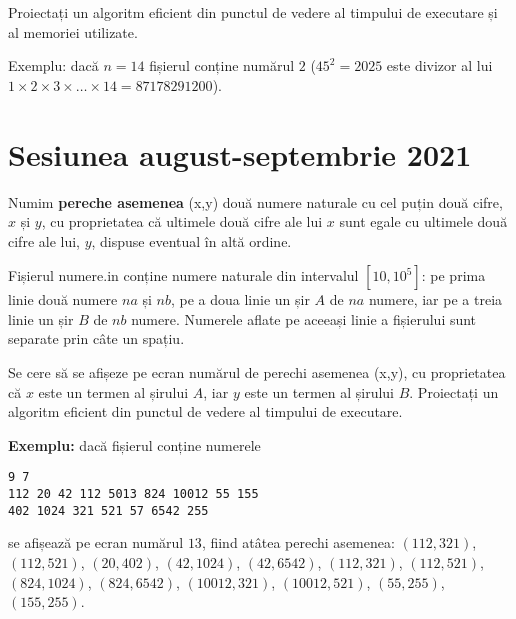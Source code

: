 \documentclass[10pt, a4paper]{article}
\newcommand{\highlight}[1]{{\ttfamily\color{red}#1}}
\begin{document}
\vspace{0.2cm}
\noindent Proiectați un algoritm eficient din punctul de vedere al timpului de executare și al memoriei utilizate.

\vspace{0.2cm}
\noindent Exemplu: dacă \highlight{$n=14$} fișierul conține numărul \highlight{$2$} (\highlight{$45^2=2025$} este divizor al lui \highlight{$1\times2\times3\times\dots\times14=87178291200$}).

\newpage
\section{Sesiunea august-septembrie 2021}
Numim \textbf{pereche asemenea} \highlight{(x,y)} două numere naturale cu cel puțin două cifre, \highlight{$x$} și \highlight{$y$}, cu proprietatea că ultimele două cifre ale lui \highlight{$x$} sunt egale cu ultimele două cifre ale lui, \highlight{$y$}, dispuse eventual în altă ordine.

\vspace{0.2cm}
\noindent Fișierul \highlight{numere.in} conține numere naturale din intervalul \highlight{$[10,10^5]$}: pe prima linie două numere \highlight{$na$} și \highlight{$nb$}, pe a doua linie un șir \highlight{$A$} de \highlight{$na$} numere, iar pe a treia linie un șir \highlight{$B$} de \highlight{$nb$} numere. Numerele aflate pe aceeași linie a fișierului sunt separate prin câte un spațiu.

\vspace{0.2cm}
\noindent Se cere să se afișeze pe ecran numărul de perechi asemenea \highlight{(x,y)}, cu proprietatea că \highlight{$x$} este un termen al șirului \highlight{$A$}, iar \highlight{$y$} este un termen al șirului \highlight{$B$}. Proiectați un algoritm eficient din punctul de vedere al timpului de executare.

\vspace{0.2cm}
\noindent \textbf{Exemplu:} dacă fișierul conține numerele
\begin{verbatim}
9 7 
112 20 42 112 5013 824 10012 55 155 
402 1024 321 521 57 6542 255
\end{verbatim}
se afișează pe ecran numărul \highlight{$13$}, fiind atâtea perechi asemenea: \highlight{$(112,321)$}, \highlight{$(112,521)$}, \highlight{$(20,402)$}, \highlight{$(42,1024)$}, \highlight{$(42,6542)$}, \highlight{$(112,321)$}, \highlight{$(112,521)$}, \highlight{$(824,1024)$}, \highlight{$(824,6542)$}, \highlight{$(10012,321)$}, \highlight{$(10012,521)$}, \highlight{$(55,255)$}, \highlight{$(155,255)$}.
\end{document}
